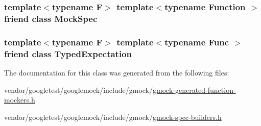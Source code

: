 \subsubsection[{\texorpdfstring{Mock\+Spec}{MockSpec}}]{\setlength{\rightskip}{0pt plus 5cm}template$<$typename F$>$ template$<$typename Function $>$ friend class {\bf Mock\+Spec}\hspace{0.3cm}{\ttfamily [friend]}}\hypertarget{classtesting_1_1internal_1_1FunctionMockerBase_ae72aeee91c93e8ae5e1ed7f726a766b2}{}\label{classtesting_1_1internal_1_1FunctionMockerBase_ae72aeee91c93e8ae5e1ed7f726a766b2}
\subsubsection[{\texorpdfstring{Typed\+Expectation}{TypedExpectation}}]{\setlength{\rightskip}{0pt plus 5cm}template$<$typename F$>$ template$<$typename Func $>$ friend class {\bf Typed\+Expectation}\hspace{0.3cm}{\ttfamily [friend]}}\hypertarget{classtesting_1_1internal_1_1FunctionMockerBase_a4f17de55396a8ef740d5ad2b1380a851}{}\label{classtesting_1_1internal_1_1FunctionMockerBase_a4f17de55396a8ef740d5ad2b1380a851}


The documentation for this class was generated from the following files\+:\begin{DoxyCompactItemize}
\item 
vendor/googletest/googlemock/include/gmock/\hyperlink{gmock-generated-function-mockers_8h}{gmock-\/generated-\/function-\/mockers.\+h}\item 
vendor/googletest/googlemock/include/gmock/\hyperlink{gmock-spec-builders_8h}{gmock-\/spec-\/builders.\+h}\end{DoxyCompactItemize}
